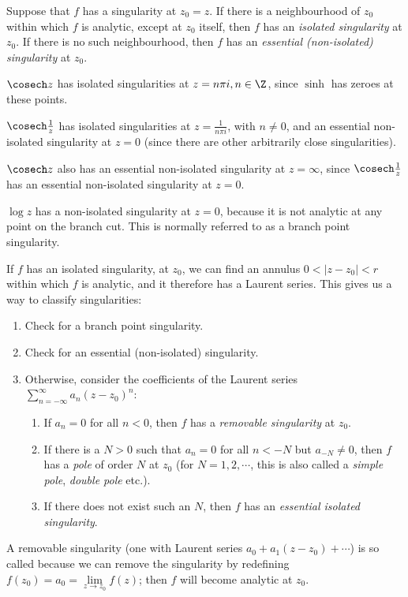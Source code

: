 \documentclass[a4paper]{article}
\begin{document}
\begin{defi}
  Suppose that $f$ has a singularity at $z_0 = z$. If there is a neighbourhood of $z_0$ within which $f$ is analytic, except at $z_0$ itself, then $f$ has an \emph{isolated singularity} at $z_0$. If there is no such neighbourhood, then $f$ has an \emph{essential (non-isolated) singularity} at $z_0$.
\end{defi}

\begin{eg}
  $\cosech z$ has isolated singularities at $z = n \pi i, n \in \Z$, since $\sinh$ has zeroes at these points.
\end{eg}

\begin{eg}
  $\cosech \frac{1}{z}$ has isolated singularities at $z = \frac{1}{n \pi i}$, with $n \not= 0$, and an essential non-isolated singularity at $z = 0$ (since there are other arbitrarily close singularities).
\end{eg}

\begin{eg}
  $\cosech z$ also has an essential non-isolated singularity at $z = \infty$, since $\cosech \frac{1}{z}$ has an essential non-isolated singularity at $z = 0$.
\end{eg}

\begin{eg}
  $\log z$ has a non-isolated singularity at $z = 0$, because it is not analytic at any point on the branch cut. This is normally referred to as a branch point singularity.
\end{eg}

If $f$ has an isolated singularity, at $z_0$, we can find an annulus $0 < |z - z_0| < r$ within which $f$ is analytic, and it therefore has a Laurent series. This gives us a way to classify singularities:

\begin{enumerate}
  \item Check for a branch point singularity.
  \item Check for an essential (non-isolated) singularity.
  \item Otherwise, consider the coefficients of the Laurent series $\sum_{n = -\infty}^\infty a_n (z - z_0)^n$:
    \begin{enumerate}
      \item If $a_n = 0$ for all $n < 0$, then $f$ has a \emph{removable singularity} at $z_0$.
      \item If there is a $N > 0$ such that $a_n = 0$ for all $n < -N$ but $a_{-N} \not= 0$, then $f$ has a \emph{pole} of order $N$ at $z_0$ (for $N = 1, 2, \cdots$, this is also called a \emph{simple pole}, \emph{double pole} etc.).
      \item If there does not exist such an $N$, then $f$ has an \emph{essential isolated singularity}.
    \end{enumerate}
\end{enumerate}
A removable singularity (one with Laurent series $a_0 + a_1 (z - z_0) + \cdots$) is so called because we can remove the singularity by redefining $f(z_0) = a_0 = \lim\limits_{z \to z_0}f(z)$; then $f$ will become analytic at $z_0$.
\end{document}
